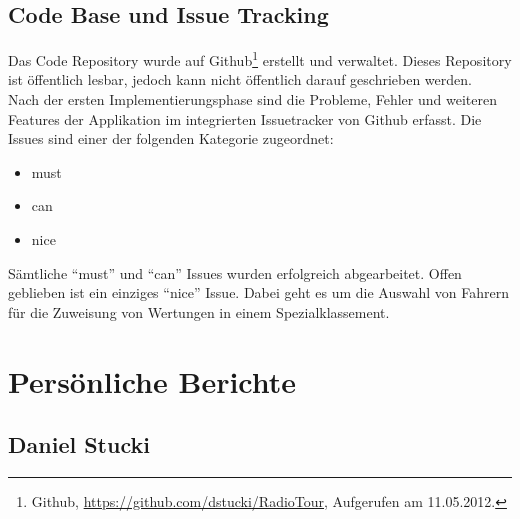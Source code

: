 \subsection{Code Base und Issue Tracking}
Das Code Repository wurde auf Github\footnote{Github, \url{https://github.com/dstucki/RadioTour}, Aufgerufen am 11.05.2012.} erstellt und verwaltet. Dieses Repository ist öffentlich lesbar, jedoch kann nicht öffentlich darauf geschrieben werden.
\\
Nach der ersten Implementierungsphase sind die Probleme, Fehler und weiteren Features der Applikation im integrierten Issuetracker von Github erfasst. Die Issues sind einer der folgenden Kategorie zugeordnet:

\begin{itemize}
\item must
\item can
\item nice
\end{itemize}

Sämtliche "`must"' und "`can"' Issues wurden erfolgreich abgearbeitet. Offen geblieben ist ein einziges "`nice"' Issue. Dabei geht es um die Auswahl von Fahrern für die Zuweisung von Wertungen in einem Spezialklassement.




\section{Persönliche Berichte}

\subsection{Daniel Stucki}

